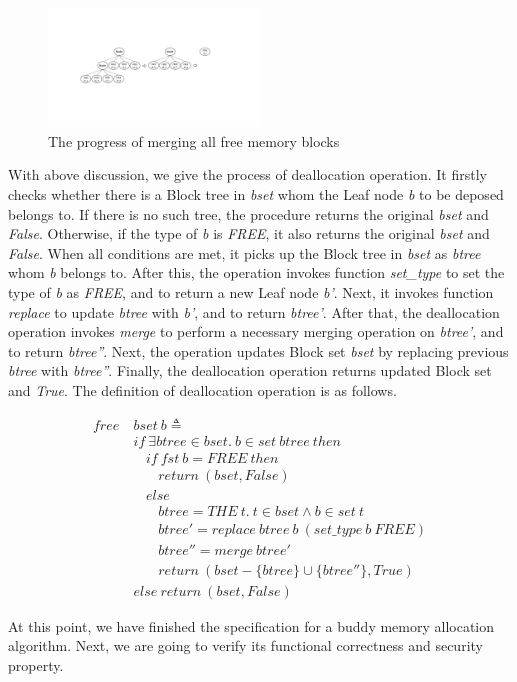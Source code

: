 \begin{figure}[htbp]
	\centering
	\includegraphics[width=0.5\textwidth]{fig2.pdf}
	\caption{The progress of merging all free memory blocks}
	\label{fig2}
\end{figure}

With above discussion, we give the process of deallocation operation. It firstly checks whether there is a Block tree in \emph{bset} whom the Leaf node \emph{b} to be deposed belongs to. If there is no such tree, the procedure returns the original \emph{bset} and \emph{False}. Otherwise, if the type of \emph{b} is \emph{FREE}, it also returns the original \emph{bset} and \emph{False}. When all conditions are met, it picks up the Block tree in \emph{bset} as \emph{btree} whom \emph{b} belongs to. After this, the operation invokes function \emph{set\_type} to set the type of \emph{b} as \emph{FREE}, and to return a new Leaf node \emph{b'}. Next, it invokes function \emph{replace} to update \emph{btree} with \emph{b'}, and to return \emph{btree'}. After that, the deallocation operation invokes \emph{merge} to perform a necessary merging operation on \emph{btree'}, and to return \emph{btree''}. Next, the operation updates Block set \emph{bset} by replacing previous \emph{btree} with \emph{btree''}. Finally, the deallocation operation returns updated Block set and \emph{True}. The definition of deallocation operation is as follows.

\begin{definition} 
\end{definition}
\vspace{-7pt}
{\footnotesize
\begin{align*}
free\ &bset\ b \triangleq \\
&if\ \exists btree \in bset.\ b \in set\ btree\ then \\
&\ \ \ \ if\ fst\ b = FREE\ then \\
&\ \ \ \ \ \ \ \ return\ (bset, False) \\
&\ \ \ \ else \\
&\ \ \ \ \ \ \ \ btree = THE\ t.\ t \in bset \wedge b \in set\ t \\
&\ \ \ \ \ \ \ \ btree' = replace\ btree\ b\ (set\_type\ b\ FREE) \\
&\ \ \ \ \ \ \ \ btree'' = merge\ btree' \\
&\ \ \ \ \ \ \ \ return\ (bset - \lbrace btree \rbrace \cup \lbrace btree'' \rbrace, True) \\
&else\ return\ (bset, False)
\end{align*}
}
\vspace{-12pt}

At this point, we have finished the specification for a buddy memory allocation algorithm. Next, we are going to verify its functional correctness and security property.